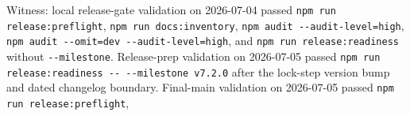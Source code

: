 \begin{itemize}
  Witness: local release-gate validation on 2026-07-04 passed \texttt{n\allowbreak{}p\allowbreak{}m\allowbreak{} \allowbreak{}r\allowbreak{}u\allowbreak{}n\allowbreak{} \allowbreak{}r\allowbreak{}e\allowbreak{}l\allowbreak{}e\allowbreak{}a\allowbreak{}s\allowbreak{}e\allowbreak{}:\allowbreak{}p\allowbreak{}r\allowbreak{}e\allowbreak{}f\allowbreak{}l\allowbreak{}i\allowbreak{}g\allowbreak{}h\allowbreak{}t}, \texttt{n\allowbreak{}p\allowbreak{}m\allowbreak{} \allowbreak{}r\allowbreak{}u\allowbreak{}n\allowbreak{} \allowbreak{}d\allowbreak{}o\allowbreak{}c\allowbreak{}s\allowbreak{}:\allowbreak{}i\allowbreak{}n\allowbreak{}v\allowbreak{}e\allowbreak{}n\allowbreak{}t\allowbreak{}o\allowbreak{}r\allowbreak{}y}, \texttt{n\allowbreak{}p\allowbreak{}m\allowbreak{} \allowbreak{}a\allowbreak{}u\allowbreak{}d\allowbreak{}i\allowbreak{}t\allowbreak{} \allowbreak{}-\allowbreak{}-\allowbreak{}a\allowbreak{}u\allowbreak{}d\allowbreak{}i\allowbreak{}t\allowbreak{}-\allowbreak{}l\allowbreak{}e\allowbreak{}v\allowbreak{}e\allowbreak{}l\allowbreak{}=\allowbreak{}h\allowbreak{}i\allowbreak{}g\allowbreak{}h}, \texttt{n\allowbreak{}p\allowbreak{}m\allowbreak{} \allowbreak{}a\allowbreak{}u\allowbreak{}d\allowbreak{}i\allowbreak{}t\allowbreak{} \allowbreak{}-\allowbreak{}-\allowbreak{}o\allowbreak{}m\allowbreak{}i\allowbreak{}t\allowbreak{}=\allowbreak{}d\allowbreak{}e\allowbreak{}v\allowbreak{} \allowbreak{}-\allowbreak{}-\allowbreak{}a\allowbreak{}u\allowbreak{}d\allowbreak{}i\allowbreak{}t\allowbreak{}-\allowbreak{}l\allowbreak{}e\allowbreak{}v\allowbreak{}e\allowbreak{}l\allowbreak{}=\allowbreak{}h\allowbreak{}i\allowbreak{}g\allowbreak{}h}, and \texttt{n\allowbreak{}p\allowbreak{}m\allowbreak{} \allowbreak{}r\allowbreak{}u\allowbreak{}n\allowbreak{} \allowbreak{}r\allowbreak{}e\allowbreak{}l\allowbreak{}e\allowbreak{}a\allowbreak{}s\allowbreak{}e\allowbreak{}:\allowbreak{}r\allowbreak{}e\allowbreak{}a\allowbreak{}d\allowbreak{}i\allowbreak{}n\allowbreak{}e\allowbreak{}s\allowbreak{}s} without \texttt{-\allowbreak{}-\allowbreak{}m\allowbreak{}i\allowbreak{}l\allowbreak{}e\allowbreak{}s\allowbreak{}t\allowbreak{}o\allowbreak{}n\allowbreak{}e}. Release-prep validation on 2026-07-05 passed \texttt{n\allowbreak{}p\allowbreak{}m\allowbreak{} \allowbreak{}r\allowbreak{}u\allowbreak{}n\allowbreak{} \allowbreak{}r\allowbreak{}e\allowbreak{}l\allowbreak{}e\allowbreak{}a\allowbreak{}s\allowbreak{}e\allowbreak{}:\allowbreak{}r\allowbreak{}e\allowbreak{}a\allowbreak{}d\allowbreak{}i\allowbreak{}n\allowbreak{}e\allowbreak{}s\allowbreak{}s\allowbreak{} \allowbreak{}-\allowbreak{}-\allowbreak{} \allowbreak{}-\allowbreak{}-\allowbreak{}m\allowbreak{}i\allowbreak{}l\allowbreak{}e\allowbreak{}s\allowbreak{}t\allowbreak{}o\allowbreak{}n\allowbreak{}e\allowbreak{} \allowbreak{}v\allowbreak{}7\allowbreak{}.\allowbreak{}2\allowbreak{}.\allowbreak{}0} after the lock-step version bump and dated changelog boundary. Final-main validation on 2026-07-05 passed \texttt{n\allowbreak{}p\allowbreak{}m\allowbreak{} \allowbreak{}r\allowbreak{}u\allowbreak{}n\allowbreak{} \allowbreak{}r\allowbreak{}e\allowbreak{}l\allowbreak{}e\allowbreak{}a\allowbreak{}s\allowbreak{}e\allowbreak{}:\allowbreak{}p\allowbreak{}r\allowbreak{}e\allowbreak{}f\allowbreak{}l\allowbreak{}i\allowbreak{}g\allowbreak{}h\allowbreak{}t}, 
\end{itemize}
